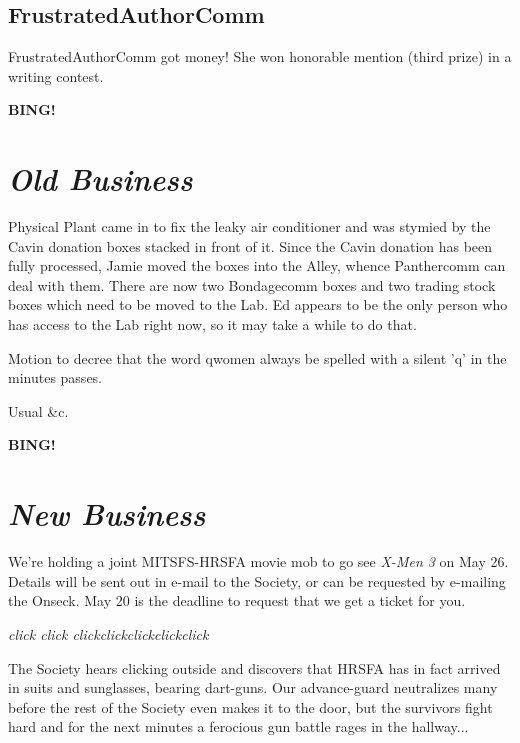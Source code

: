 \documentclass[10pt]{article}
\newcommand{\bing}{{\bf BING!} }
\newcommand{\goto}[1]{\bing \vskip 12pt \section*{{\em{#1}}}}
\begin{document}
\subsection*{FrustratedAuthorComm}
FrustratedAuthorComm got money!  She won honorable mention (third prize) in a writing contest.





\goto{Old Business}

Physical Plant came in to fix the leaky air conditioner and was stymied by the
Cavin donation boxes stacked in front of it.  Since the Cavin donation has been
fully processed, Jamie moved the boxes into the Alley, whence Panthercomm can deal with them.
There are now two
Bondagecomm boxes and two trading stock boxes which need to be moved to the 
Lab.  Ed appears to be the only person who has access to the Lab right now, so 
it may take a while to do that.

Motion to decree that the word qwomen always be spelled with a silent 'q' in
the minutes passes.

Usual \&c.

\goto{New Business}

We're holding a joint MITSFS-HRSFA movie mob to go see \emph{X-Men 3} on May
26.  Details will be sent out in e-mail to the Society, or can be requested 
by e-mailing the Onseck.  May 20 is the deadline to request that we get a 
ticket for you.

\emph{click click clickclickclickclickclick}

The Society hears clicking outside and discovers that 
HRSFA has in fact arrived in suits and sunglasses, bearing dart-guns.  Our 
advance-guard neutralizes many before the rest of the Society even makes it to
the door, but the survivors fight hard and for the next minutes a ferocious 
gun battle rages in the hallway...
\end{document}
